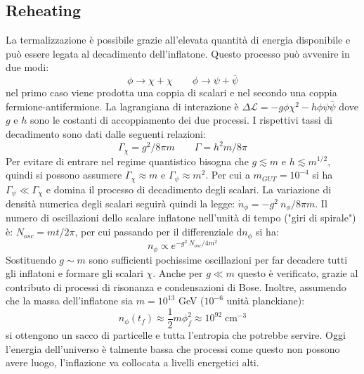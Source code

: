 \subsection{Reheating}
La termalizzazione è possibile grazie all'elevata quantità di energia disponibile e può essere legata al decadimento dell'inflatone. Questo processo può avvenire in due modi:
$$
\phi \rightarrow \chi + \chi \qquad \phi \rightarrow \psi + {\overbar{\psi}}
$$
nel primo caso viene prodotta una coppia di scalari e nel secondo una coppia fermione-antifermione. La lagrangiana di interazione è $\Delta \mathcal{L} = -g \phi \chi^2 - h \phi \psi {\overbar{\psi}}$ dove $g$ e $h$ sono le costanti di accoppiamento dei due processi. I rispettivi tassi di decadimento sono dati dalle seguenti relazioni:
$$
\Gamma_\chi = g^2 / 8\pi m \qquad \Gamma =h^2 m / 8\pi 
$$
Per evitare di entrare nel regime quantistico bisogna che $g \lesssim m$ e $h\lesssim m^{1/2}$, quindi si possono assumere $\Gamma_\chi \approx m$ e $\Gamma_\psi \approx m^2$. Per cui a $m_{GUT}=10^{-4}$ si ha $\Gamma_\psi \ll \Gamma_\chi$ e domina il processo di decadimento degli scalari. La variazione di densità numerica degli scalari seguirà quindi la legge: $\dot{n}_\phi = - g^2 ~n_\phi / 8\pi m$. Il numero di oscillazioni dello scalare inflatone nell'unità di tempo ("giri di spirale") è: $N_{osc}=mt/2\pi$, per cui passando per il differenziale $\mathrm{d}n_\phi$ si ha:
\begin{equation}
    n_\phi \propto e^{-g^2 ~N_{osc}/4m^2}
\end{equation}
Sostituendo $g \sim m$ sono sufficienti pochissime oscillazioni per far decadere tutti gli inflatoni e formare gli scalari $\chi$. Anche per $g \ll m$ questo è verificato, grazie al contributo di processi di risonanza e condensazioni di Bose. Inoltre, assumendo che la massa dell'inflatone sia $m=10^{13}$ GeV ($10^{-6}$ unità planckiane):
\begin{equation}
    n_\phi (t_f)\approx \frac{1}{2}m\phi_f^2 \approx 10^{92}\; \mathrm{cm^{-3}}
\end{equation}
si ottengono un sacco di particelle e tutta l'entropia che potrebbe servire. Oggi l'energia dell'universo è talmente bassa che processi come questo non possono avere luogo, l'inflazione va collocata a livelli energetici alti.

